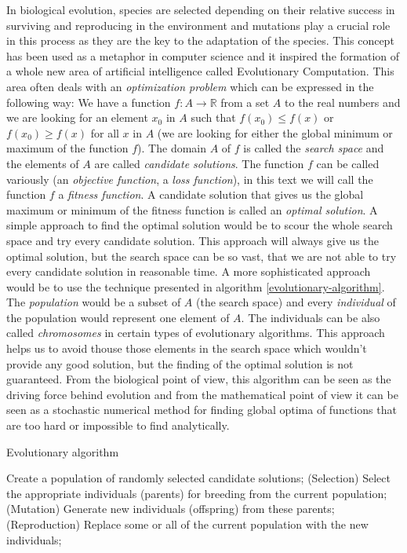 In biological evolution, species are selected depending on their relative success in surviving and reproducing in the environment and mutations play a crucial role in this process as they are the key to the adaptation of the species. This concept has been used as a metaphor in computer science and it inspired the formation of a whole new area of artificial intelligence called Evolutionary Computation. This area often deals with an \textit{optimization problem} which can be expressed in the following way: We have a function $f: A \to \mathbb{R}$ from a set $A$ to the real numbers and we are looking for an element $x_0$ in $A$ such that $f(x_0) \leq f(x)$ or $f(x_0) \geq f(x)$ for all $x$ in $A$ (we are looking for either the global minimum or maximum of the function $f$). The domain $A$ of $f$ is called the \textit{search space} and the elements of $A$ are called \textit{candidate solutions}. The function $f$ can be called variously (an \textit{objective function}, a \textit{loss function}), in this text we will call the function $f$ a \textit{fitness function}. A candidate solution that gives us the global maximum or minimum of the fitness function is called an \textit{optimal solution}.
A simple approach to find the optimal solution would be to scour the whole search space and try every candidate solution. This approach will always give us the optimal solution, but the search space can be so vast, that we are not able to try every candidate solution in reasonable time. 
A more sophisticated approach would be to use the technique presented in algorithm \ref{evolutionary-algorithm}. The \textit{population} would be a subset of $A$ (the search space) and every \textit{individual} of the population would represent one element of $A$. The individuals can be also called \textit{chromosomes} in certain types of evolutionary algorithms. This approach helps us to avoid thouse those elements in the search space which wouldn't provide any good solution, but the finding of the optimal solution is not guaranteed.
From the biological point of view, this algorithm can be seen as the driving force behind evolution and from the mathematical point of view it can be seen as a stochastic numerical method for finding global optima of functions that are too hard or impossible to find analytically.
\begin{algorithm}
	\caption{Evolutionary algorithm}\label{evolutionary-algorithm}
	\begin{algorithmic}[1]
		\State Create a population of randomly selected candidate solutions;
		\State (Selection) Select the appropriate individuals (parents) for breeding from the current population;
		\State (Mutation) Generate new individuals (offspring) from these parents;
		\State (Reproduction) Replace some or all of the current population with the new individuals;
		\EndWhile
	\end{algorithmic}
\end{algorithm}

